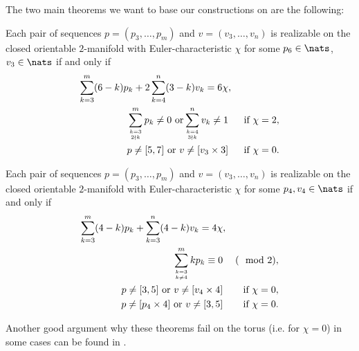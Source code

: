The two main theorems we want to base our constructions on are the following:

\begin{theorem} \label{thm:eberhard:extended:3}
  Each pair of sequences $p = (p_3, \dots, p_m)$ and $v = (v_3, \dots, v_n)$ is realizable on the closed orientable $2$-manifold with {\sc Euler}-characteristic $\chi$ for some $p_6 \in \nats$, $v_3 \in \nats$ if and only if
  \begin{align*}
    \sum_{k=3}^m (6-k)p_k + 2 \sum_{k=4}^n (3-k)v_k = 6\chi&, \\
    \sum_{k=3 \atop 2 \nmid k}^{m} p_k \neq 0 \text{ or} \sum_{k=4 \atop 3 \nmid k}^n v_k \neq 1& &\text{ if } \chi = 2, \\
    p \neq [5, 7] \text{ or } v \neq [v_3 \times 3]& &\text{ if } \chi = 0.
  \end{align*}
\end{theorem}

\begin{theorem} \label{thm:eberhard:extended:4}
  Each pair of sequences $p = (p_3, \dots, p_m)$ and $v = (v_3, \dots, v_n)$ is realizable on the closed orientable $2$-manifold with {\sc Euler}-characteristic $\chi$ for some $p_4, v_4 \in \nats$ if and only if
  \begin{align*}
    \sum_{k=3}^m (4-k)p_k + \sum_{k = 3}^n (4-k)v_k = 4\chi&, \\
    \sum_{k=3 \atop k \neq 4}^m k p_k \equiv 0&& (\mod 2), \\
    p \neq [3, 5] \text{ or } v \neq [v_4 \times 4]& &\text{ if } \chi = 0,\\
    p \neq [p_4 \times 4] \text{ or } v \neq [3, 5]& &\text{ if } \chi = 0.
  \end{align*}
\end{theorem}

Another good argument why these theorems fail on the torus (i.e. for $\chi = 0$) in some cases can be found in \cite{izmestiev2013there}.